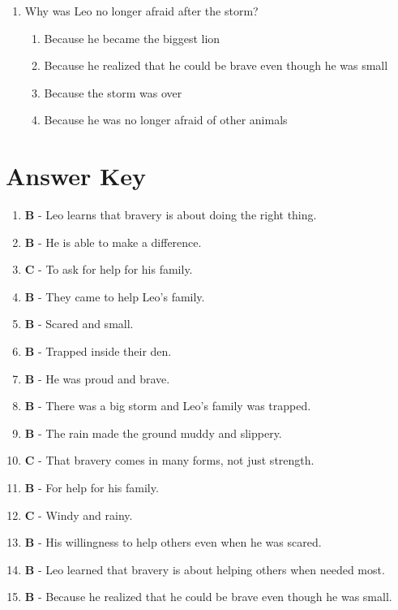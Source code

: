 \documentclass[12pt]{article}
\begin{document}
\begin{enumerate}
    \vspace{0.5cm}

    \item Why was Leo no longer afraid after the storm?

    \begin{enumerate}[label=\Alph*.]
        \item Because he became the biggest lion
        \item Because he realized that he could be brave even though he was small
        \item Because the storm was over
        \item Because he was no longer afraid of other animals
    \end{enumerate}

    \vspace{0.5cm}

\end{enumerate}

\newpage

\section*{Answer Key}

\begin{enumerate}

    \item \textbf{B} - Leo learns that bravery is about doing the right thing.
    \item \textbf{B} - He is able to make a difference.
    \item \textbf{C} - To ask for help for his family.
    \item \textbf{B} - They came to help Leo's family.
    \item \textbf{B} - Scared and small.
    \item \textbf{B} - Trapped inside their den.
    \item \textbf{B} - He was proud and brave.
    \item \textbf{B} - There was a big storm and Leo's family was trapped.
    \item \textbf{B} - The rain made the ground muddy and slippery.
    \item \textbf{C} - That bravery comes in many forms, not just strength.
    \item \textbf{B} - For help for his family.
    \item \textbf{C} - Windy and rainy.
    \item \textbf{B} - His willingness to help others even when he was scared.
    \item \textbf{B} - Leo learned that bravery is about helping others when needed most.
    \item \textbf{B} - Because he realized that he could be brave even though he was small.

\end{enumerate}
\end{document}
